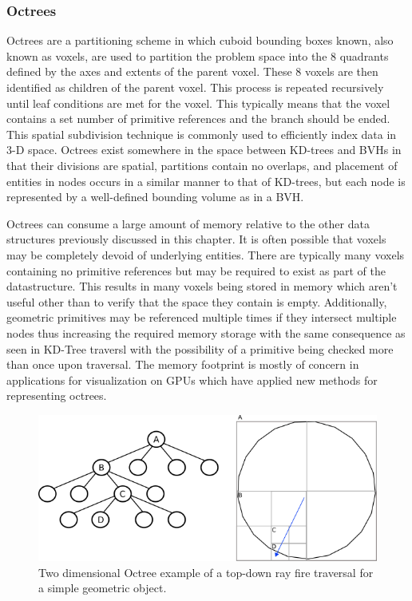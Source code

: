\documentclass[12pt, a4paper]{article}
\begin{document}
\subsubsection{Octrees}%
\label{sec:octree}
Octrees are a partitioning scheme in which cuboid bounding boxes known, also known as voxels, are used to partition the problem space into the 8 quadrants defined by the axes and extents of the parent voxel. These 8 voxels are then identified as children of the parent voxel. This process is repeated recursively until leaf conditions are met for the voxel. This typically means that the voxel contains a set number of primitive references and the branch should be ended. This spatial subdivision technique is commonly used to efficiently index data in 3-D space.\cite{Glassner_1989} Octrees exist somewhere in the space between KD-trees and BVHs in that their divisions are spatial, partitions contain no overlaps, and placement of entities in nodes occurs in a similar manner to that of KD-trees, but each node is represented by a well-defined bounding volume as in a BVH.

Octrees can consume a large amount of memory relative to the other data structures previously discussed in this chapter. It is often possible that voxels may be completely devoid of underlying entities. There are typically many voxels containing no primitive references but may be required to exist as part of the datastructure. This results in many voxels being stored in memory which aren't useful other than to verify that the space they contain is empty. Additionally, geometric primitives may be referenced multiple times if they intersect multiple nodes thus increasing the required memory storage with the same consequence as seen in KD-Tree traversl with the possibility of a primitive being checked more than once upon traversal. The memory footprint is mostly of concern in applications for visualization on GPUs which have applied new methods for representing octrees.

\begin{figure}[H]
  \centering
  \includegraphics[scale=0.65]{octree_2d_ex.png}
  \caption{Two dimensional Octree example of a top-down ray fire traversal for a simple geometric object.}
  \label{octree_2d_ex}
\end{figure}
\end{document}

